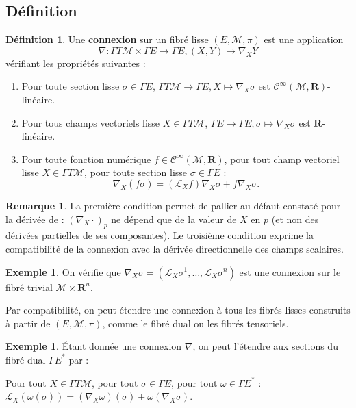 \documentclass[12pt,a4paper]{article}
\theoremstyle{definition}
\newtheorem{defn}[thm]{Définition}
\newtheorem{ex}[thm]{Exemple}
\newtheorem{rqe}[thm]{Remarque}
\begin{document}
\subsection{Définition}
\begin{defn}
Une \textbf{connexion} sur un fibré  lisse $(E,\mathcal{M},\pi)$ est une application
$$\nabla: \Gamma T\mathcal{M}\times \Gamma E\to\Gamma E,(X,Y)\mapsto\nabla_XY$$
vérifiant les propriétés suivantes :
\begin{enumerate}[label=\roman*)]
\item Pour toute section lisse $\sigma\in\Gamma E$, $\Gamma T\mathcal{M}\to\Gamma E,X\mapsto\nabla_X\sigma$ est $\mathcal{C}^\infty(\mathcal{M},\mathbf{R})$-linéaire.
\item Pour tous champs vectoriels lisse $X\in\Gamma T\mathcal{M}$, $\Gamma E\to\Gamma E,\sigma\mapsto\nabla_X\sigma$ est $\mathbf{R}$-linéaire.
\item Pour toute fonction numérique $f\in\mathcal{C}^\infty(\mathcal{M},\mathbf{R})$, pour tout champ vectoriel lisse $X\in\Gamma T\mathcal{M}$, pour toute section lisse $\sigma\in \Gamma E$ :
$$\nabla_X(f\sigma)=\left(\mathcal{L}_Xf\right)\nabla_X\sigma+f\nabla_X\sigma.$$
\end{enumerate}
\end{defn}
\begin{rqe}
La première condition permet de pallier au défaut constaté pour la dérivée de  : $(\nabla_X\cdot)_p$ ne dépend que de la valeur de $X$ en $p$ (et non des dérivées partielles de ses composantes). Le troisième condition exprime la compatibilité de la connexion avec la dérivée directionnelle des champs scalaires.
\end{rqe}
\begin{ex}
On vérifie que $\nabla_X\sigma=(\mathcal{L}_X\sigma^1,\ldots,\mathcal{L}_X\sigma^n)$ est une connexion sur le fibré trivial $\mathcal{M}\times\mathbf{R}^n$.
\end{ex}
Par compatibilité, on peut étendre une connexion  à tous les fibrés lisses construits à partir de $(E,\mathcal{M},\pi)$, comme le fibré dual ou les fibrés tensoriels.
\begin{ex}
Étant donnée une connexion $\nabla$, on peut l'étendre aux sections du fibré dual $\Gamma E^*$ par :
\begin{center}
Pour tout $X\in \Gamma T\mathcal{M}$, pour tout $\sigma\in\Gamma E$, pour tout $\omega\in\Gamma E^*$ : $\mathcal{L}_X(\omega(\sigma))=\left(\nabla_X\omega\right)(\sigma)+\omega(\nabla_X\sigma)$.
\end{center}
\end{ex}
\end{document}
